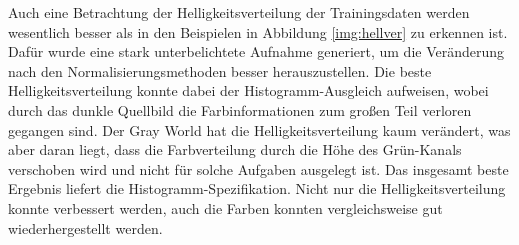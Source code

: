 Auch eine Betrachtung der Helligkeitsverteilung der Trainingsdaten werden wesentlich besser als in den Beispielen in Abbildung \ref{img:hellver} zu erkennen ist. Dafür wurde eine stark unterbelichtete Aufnahme generiert, um die Veränderung nach den Normalisierungsmethoden besser herauszustellen. Die beste Helligkeitsverteilung konnte dabei der Histogramm-Ausgleich aufweisen, wobei durch das dunkle Quellbild die Farbinformationen zum großen Teil verloren gegangen sind. Der Gray World hat die Helligkeitsverteilung kaum verändert, was aber daran liegt, dass die Farbverteilung durch die Höhe des Grün-Kanals verschoben wird und nicht für solche Aufgaben ausgelegt ist. Das insgesamt beste Ergebnis liefert die Histogramm-Spezifikation. Nicht nur die Helligkeitsverteilung konnte verbessert werden, auch die Farben konnten vergleichsweise gut wiederhergestellt werden.